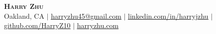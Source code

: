\pagestyle{fancy}
\fancyhf{} %
\fancyfoot{}
\renewcommand{\headrulewidth}{0pt}
\renewcommand{\footrulewidth}{0pt}

\begin{center}
    \textbf{\Huge\scshape Harry Zhu} \\ \vspace{1pt}
    Oakland, CA
    $|$ \href{mailto:harryzhu45@gmail.com}{\underline{harryzhu45@gmail.com}}
    $|$ \href{https://linkedin.com/in/harryjzhu}{\underline{linkedin.com/in/harryjzhu}}
    $|$ \href{https://github.com/HarryZ10}{\underline{github.com/HarryZ10}}
    $|$ \href{https://harryzhu.com}{\underline{harryzhu.com}}
\end{center}
